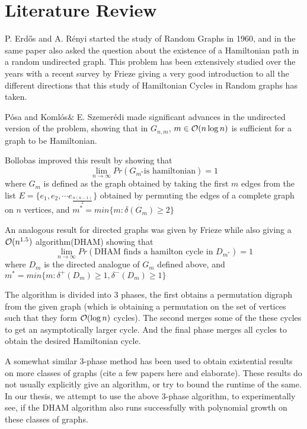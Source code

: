 \chapter{Literature Review}
\label{ch:review}
\vspace{2em}

P. Erdős and  A. Rényi started the study of Random Graphs \cite{erds:rand} in 1960, and in the same paper also asked the question about the existence of a Hamiltonian path in a random undirected graph. 
This problem has been extensively studied over the years with a recent survey by Frieze \cite{frieze:2019survey} giving a very good introduction to all the different directions that this study of Hamiltonian Cycles in Random graphs has taken.

Pósa\cite{posa:ham} and Komlós$\&$ E. Szemerédi\cite{komlos:undir} made significant advances in the undirected version of the problem, showing that in $G_{n, m}$, $m \in \mathcal{O}(n\log n)$ is sufficient for a graph to be Hamiltonian.

Bollobas \cite{boll:ham} improved this result by showing that
\[ \lim_{n \rightarrow \infty} Pr( G_{m^*} \text{is hamiltonian}) = 1 \]
where $G_m$ is defined as the graph obtained by taking the first $m$ edges from the list $E = \{ e_1, e_2, \cdots e_{\frac{n(n-1)}{2}} \}$ obtained by permuting the edges of a complete graph on $n$ vertices, and $m^* = min\{m : \delta(G_m) \ge 2\}$

An analogous result for directed graphs was given by Frieze \cite{frieze:dham} while also giving a $\mathcal{O}(n^{1.5})$ algorithm(DHAM)  showing that 
\[ \lim_{n \rightarrow \infty} Pr( \text{DHAM finds a hamilton cycle in } D_{m^*} ) = 1 \]
where $D_m$ is the directed analogue of $G_m$ defined above, and $m^* = min\{m : \delta^+(D_m) \ge 1, \delta^-(D_m) \ge 1\}$

The algorithm is divided into 3 phases, the first obtains a permutation digraph from the given graph (which is obtaining a permutation on the set of vertices such that they form $\mathcal{O}(\log n)$ cycles). The second merges some of the these cycles to get an asymptotically larger cycle. And the final phase merges all cycles to obtain the desired Hamiltonian cycle.

A somewhat similar 3-phase method has been used to obtain existential results on more classes of graphs (cite a few papers here and elaborate). These results do not usually explicitly give an algorithm, or try to bound the runtime of the same. In our thesis, we attempt to use the above 3-phase algorithm, to experimentally see, if the DHAM algorithm also runs successfully with polynomial growth on these classes of graphs.